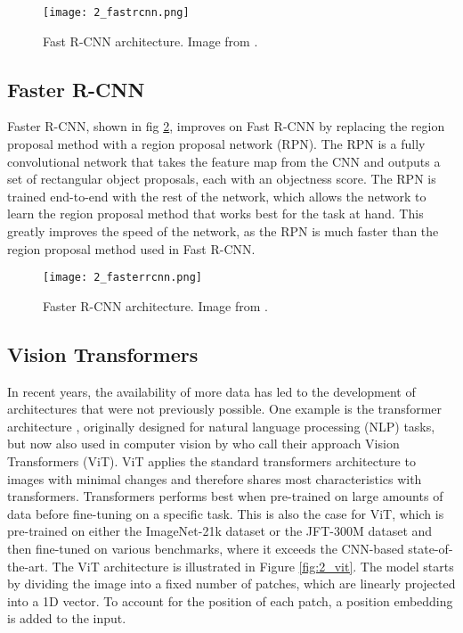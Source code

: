 \begin{figure}[H]
	\centering
	\texttt{[image: 2\_fastrcnn.png]}
	\caption{\label{fig:2_fastrcnn} Fast R-CNN architecture. Image from \citet{fastrcnn}.}
\end{figure}

\subsection{Faster R-CNN \cite{fasterrcnn}}
Faster R-CNN, shown in fig \ref{fig:2_fasterrcnn}, improves on Fast R-CNN by replacing the region proposal method with a region proposal network (RPN). The RPN is a fully convolutional network that takes the feature map from the CNN and outputs a set of rectangular object proposals, each with an objectness score. The RPN is trained end-to-end with the rest of the network, which allows the network to learn the region proposal method that works best for the task at hand. This greatly improves the speed of the network, as the RPN is much faster than the region proposal method used in Fast R-CNN.

\begin{figure}[H]
	\centering
	\texttt{[image: 2\_fasterrcnn.png]}
	\caption{\label{fig:2_fasterrcnn} Faster R-CNN architecture. Image from \citet{fasterrcnn}.}
\end{figure}

\subsection{Vision Transformers \cite{vit}}
In recent years, the availability of more data has led to the development of architectures that were not previously possible. One example is the transformer architecture \cite{transformers}, originally designed for natural language processing (NLP) tasks, but now also used in computer vision by \citet{vit} who call their approach Vision Transformers (ViT). ViT applies the standard transformers architecture to images with minimal changes and therefore shares most characteristics with transformers. Transformers performs best when pre-trained on large amounts of data before fine-tuning on a specific task. This is also the case for ViT, which is pre-trained on either the ImageNet-21k dataset or the JFT-300M dataset and then fine-tuned on various benchmarks, where it exceeds the CNN-based state-of-the-art. The ViT architecture is illustrated in Figure \ref{fig:2_vit}. The model starts by dividing the image into a fixed number of patches, which are linearly projected into a 1D vector. To account for the position of each patch, a position embedding is added to the input.

